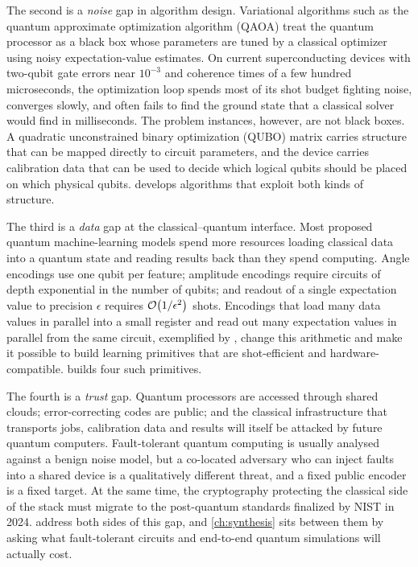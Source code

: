 The second is a \emph{noise} gap in algorithm design. Variational algorithms such as the quantum approximate optimization algorithm (QAOA) treat the quantum processor as a black box whose parameters are tuned by a classical optimizer using noisy expectation-value estimates. On current superconducting devices with two-qubit gate errors near $10^{-3}$ and coherence times of a few hundred microseconds, the optimization loop spends most of its shot budget fighting noise, converges slowly, and often fails to find the ground state that a classical solver would find in milliseconds. The problem instances, however, are not black boxes. A quadratic unconstrained binary optimization (QUBO) matrix carries structure that can be mapped directly to circuit parameters, and the device carries calibration data that can be used to decide which logical qubits should be placed on which physical qubits.  develops algorithms that exploit both kinds of structure.

The third is a \emph{data} gap at the classical--quantum interface. Most proposed quantum machine-learning models spend more resources loading classical data into a quantum state and reading results back than they spend computing. Angle encodings use one qubit per feature; amplitude encodings require circuits of depth exponential in the number of qubits; and readout of a single expectation value to precision $\epsilon$ requires $\mathcal{O}\!\left(1/\epsilon^{2}\right)$ shots. Encodings that load many data values in parallel into a small register and read out many expectation values in parallel from the same circuit, exemplified by \qcrank, change this arithmetic and make it possible to build learning primitives that are shot-efficient and hardware-compatible.  builds four such primitives.

The fourth is a \emph{trust} gap. Quantum processors are accessed through shared clouds; error-correcting codes are public; and the classical infrastructure that transports jobs, calibration data and results will itself be attacked by future quantum computers. Fault-tolerant quantum computing is usually analysed against a benign noise model, but a co-located adversary who can inject faults into a shared device is a qualitatively different threat, and a fixed public encoder is a fixed target. At the same time, the cryptography protecting the classical side of the stack must migrate to the post-quantum standards finalized by NIST in 2024.  address both sides of this gap, and \cref{ch:synthesis} sits between them by asking what fault-tolerant circuits and end-to-end quantum simulations will actually cost.

